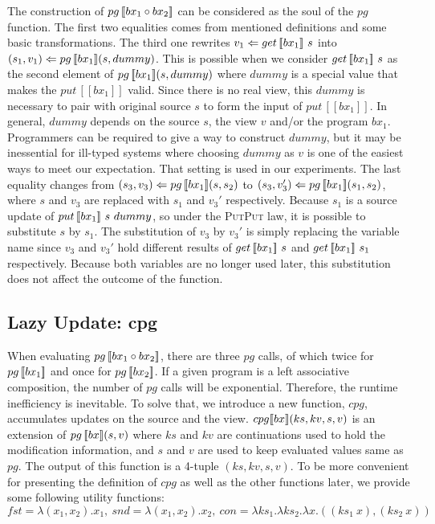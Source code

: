 The construction of $pg \, [\![bx_1 \circ bx_2]\!]$ can be considered as the soul of the $pg$ function. The first two equalities comes from mentioned definitions and some basic transformations. The third one rewrites $v_1 \Leftarrow get \, [\![bx_1]\!] \ s$ into $(s_1, v_1) \Leftarrow pg \, [\![bx_1]\!] (s, dummy)$. This is possible when we consider $get \, [\![bx_1]\!] \ s$ as the second element of $pg \, [\![bx_1]\!] (s, dummy)$ where $dummy$ is a special value that makes the $put \, [\![bx_1]\!]$ valid. Since there is no real view, this $dummy$ is necessary to pair with original source $s$ to form the input of $put \, [\![bx_1]\!]$. In general, $dummy$ depends on the source $s$, the view $v$ and/or the program $bx_1$. Programmers can be required to give a way to construct $dummy$, but it may be inessential for ill-typed systems where choosing $dummy$ as $v$ is one of the easiest ways to meet our expectation. That setting is used in our experiments. The last equality changes from $(s_3, v_3) \Leftarrow pg \, [\![bx_1]\!] (s, s_2)$ to $(s_3, v_3') \Leftarrow pg \, [\![bx_1]\!] (s_1, s_2)$, where $s$ and $v_3$ are replaced with $s_1$ and $v_3'$ respectively. Because $s_1$ is a source update of $put \, [\![bx_1]\!] \ s \ dummy$, so under the \textsc{PutPut} law, it is possible to substitute $s$ by $s_1$. The substitution of $v_3$ by $v_3'$ is simply replacing the variable name since $v_3$ and $v_3'$ hold different results of $get \, [\![bx_1]\!] \ s$ and $get \, [\![bx_1]\!] \ s_1$ respectively. Because both variables are no longer used later, this substitution does not affect the outcome of the function.

\subsection{Lazy Update: cpg} 

When evaluating $pg \, [\![bx_1 \circ bx_2]\!]$, there are three $pg$ calls, of which twice for $pg \, [\![bx_1]\!]$ and once for $pg \, [\![bx_2]\!]$. If a given program is a left associative composition, the number of $pg$ calls will be exponential. Therefore, the runtime inefficiency is inevitable. To solve that, we introduce a new function, $cpg$, accumulates updates on the source and the view. $cpg [\![bx]\!] (ks, kv, s, v)$ is an extension of $pg \, [\![bx]\!] (s, v)$ where $ks$ and $kv$ are continuations used to hold the modification information, and $s$ and $v$ are used to keep evaluated values same as $pg$. The output of this function is a 4-tuple $(ks, kv, s, v)$. To be more convenient for presenting the definition of $cpg$ as well as the other functions later, we provide some following utility functions:\\ $fst = \lambda (x_1,x_2). x_1 , \ snd = \lambda (x_1,x_2). x_2 , \ con = \lambda ks_1. \lambda ks_2. \lambda x. ((ks_1 \ x),(ks_2 \ x))$

